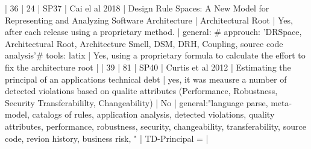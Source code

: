 | 36 |         24 | SP37 | Cai el al 2018                                                       | Design Rule Spaces: A New Model for Representing and Analyzing Software Architecture                                                                                     | Architectural Root                                                                                                                                                                                                                                       | Yes, after each release using a proprietary method.                                                                                                                                                                                                                | general: # approuch: 'DRSpace, Architectural Root, Architecture Smell, DSM, DRH, Coupling, source code analysis'# tools: latix                                                                                                                                                                           | Yes, using a proprietary formula to calculate the effort to fix the architecture root                                                                                                                                                                                                                                                                                                                                                                                                    |
| 39 |         81 | SP40 | Curtis et al 2012                                                    | Estimating the principal of an applications technical debt                                                                                                               | yes, it was meausre a number of detected violations based on qualite attributes (Performance, Robustness, Security Transferabililty, Changeability)                                                                                                      | No                                                                                                                                                                                                                                                                 | general:"language parse, meta-model, catalogs of rules, application analysis, detected violations, quality attributes, performance, robustness, security, changeability, transferability, source code, revion history, business risk, "                                                                  | TD-Principal =                                                                                                                                                                                                                                                                                                                                                                                                                                                                           |
